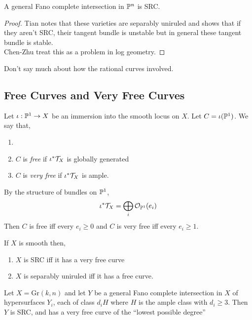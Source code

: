 \documentclass[12pt]{article}
\begin{document}
\begin{thm}
A general Fano complete intersection in $\P^n$ is SRC. 
\end{thm}

\begin{proof}
Tian notes that these varieties are separably uniruled and shows that if they aren't SRC, their tangent bundle is unstable but in general these tangent bundle is stable.
\bigskip\\
Chen-Zhu treat this as a problem in log geometry. 
\end{proof}

\begin{rmk}
Don't say much about how the rational curves involved.
\end{rmk}

\subsection{Free Curves and Very Free Curves}

\begin{defn}
Let $\iota : \P^1 \to X$ be an immersion into the smooth locus on $X$. Let $C = \iota(\P^1)$. We say that,
\begin{enumerate}
\item \item $C$ is \textit{free} if $\iota^* \T_X$ is globally generated
\item $C$ is \textit{very free} if $\iota^* \T_X$ is ample.
\end{enumerate}
\end{defn}

\begin{rmk}
By the structure of bundles on $\P^1$,
\[ \iota^* \T_X = \bigoplus_{i} \struct{\P^1}(e_i) \]
Then $C$ is free iff every $e_i \ge 0$ and $C$ is very free iff every $e_i \ge 1$.
\end{rmk}

\begin{theorem}
If $X$ is smooth then,
\begin{enumerate}
\item $X$ is SRC iff it has a very free curve
\item $X$ is separably uniruled iff it has a free curve.
\end{enumerate}
\end{theorem}

\begin{thm}[Costum - S]
Let $X = \mathrm{Gr}(k,n)$ and let $Y$ be a general Fano complete intersection in $X$ of hypersurfaces $Y_i$, each of class $d_i H$ where $H$ is the ample class with $d_i \ge 3$. Then $Y$ is SRC, and has a very free curve of the ``lowest possible degree''
\end{thm}
\end{document}
